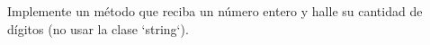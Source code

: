 Implemente un método que reciba un número entero y halle su cantidad de dígitos (no usar la clase `string`).

